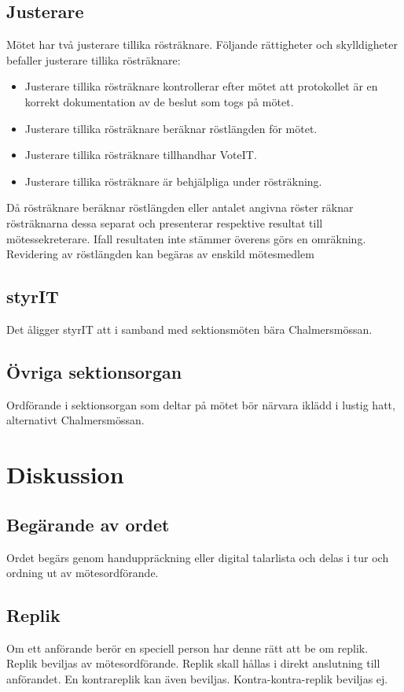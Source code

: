 \documentclass[11pt, includeaddress]{classes/cthit}
\begin{document}
\subsection{Justerare}
Mötet har två justerare tillika rösträknare. Följande rättigheter och skylldigheter befaller justerare tillika rösträknare:
\begin{itemize}
    \item Justerare tillika rösträknare kontrollerar efter mötet att protokollet är en korrekt dokumentation av de beslut som togs på mötet.
    \item Justerare tillika rösträknare beräknar röstlängden för mötet.
    \item Justerare tillika rösträknare tillhandhar VoteIT.
    \item Justerare tillika rösträknare är behjälpliga under rösträkning.
\end{itemize}
Då rösträknare beräknar röstlängden eller antalet angivna röster räknar rösträknarna dessa separat och presenterar respektive resultat till mötessekreterare.
Ifall resultaten inte stämmer överens görs en omräkning.
Revidering av röstlängden kan begäras av enskild mötesmedlem

\subsection{styrIT}
Det åligger styrIT att i samband med sektionsmöten bära Chalmersmössan.
\subsection{Övriga sektionsorgan}
Ordförande i sektionsorgan som deltar på mötet bör närvara iklädd i lustig hatt, alternativt Chalmersmössan.

\section{Diskussion}
\subsection{Begärande av ordet}
Ordet begärs genom handuppräckning eller digital talarlista och delas
i tur och ordning ut av mötesordförande.
\subsection{Replik}
Om ett anförande berör en speciell person har denne rätt att be om replik.
Replik beviljas av mötesordförande.
Replik skall hållas i direkt anslutning till anförandet.
En kontrareplik kan även beviljas.
Kontra-kontra-replik beviljas ej.
\end{document}
